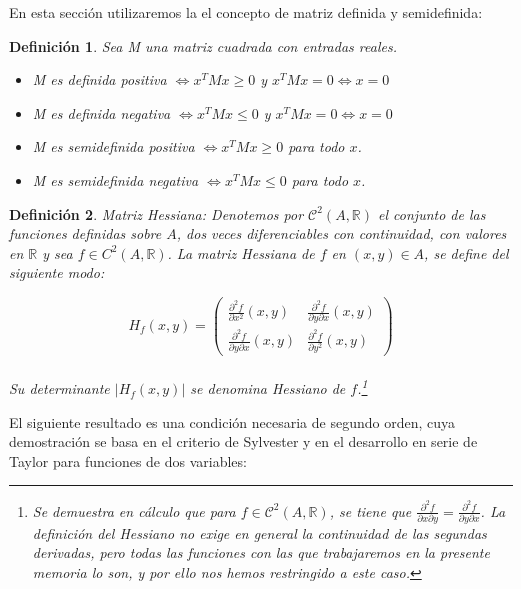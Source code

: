 \documentclass[a4paper,11pt]{article}
\newtheorem{definition}{Definición}
\begin{document}
\noindent
En esta sección utilizaremos la el concepto de matriz definida y semidefinida:
\begin{definition}Sea M una matriz cuadrada con entradas reales.
\begin{itemize}
\item M es definida positiva $\Longleftrightarrow x^TMx \geq 0$ y $x^TMx=0\Leftrightarrow x=0$
\item M es definida negativa  $\Longleftrightarrow x^TMx \leq0$ y $x^TMx=0\Leftrightarrow x=0$
\item M es semidefinida positiva  $\Longleftrightarrow x^TMx \geq0$ para todo $x$.
\item M es semidefinida negativa  $\Longleftrightarrow x^TMx \leq0$  para todo $x$.
\end{itemize}
\end{definition}
\begin{definition}
Matriz Hessiana:  Denotemos por $\mathcal{C}^2(A,\mathbb{R})$  el conjunto de las funciones definidas
sobre $A$, dos veces diferenciables con continuidad, con valores en $\mathbb{R}$ y sea $f \in
C^2(A, \mathbb{R})$. La matriz Hessiana de $f$ en $(x, y) \in A$, se define del siguiente modo:

$$
H_f(x,y)=\left(
\begin{array}{cc}
\frac{\partial^2f}{\partial x^2}(x,y) & \frac{\partial^2f}{\partial y\partial x}(x,y) \\
\frac{\partial^2f}{\partial y\partial x}(x,y) & \frac{\partial^2f}{\partial y^2}(x,y)
\end{array}
\right)
$$
\\
Su determinante $|H_f(x,y)|$ se denomina Hessiano de $f$.\footnote{Se demuestra en cálculo que para $f\in \mathcal{C}^2(A, \mathbb{R})$, se tiene que $\frac{\partial^2f}{\partial x\partial y}=\frac{\partial^2f}{\partial y\partial x}$. La definición del Hessiano no exige en general la continuidad de las segundas derivadas, pero todas las funciones con las que trabajaremos en la presente memoria lo son, y por ello nos hemos restringido a este caso.}


\end{definition}
El siguiente resultado es una condición necesaria de segundo orden, cuya demostración se basa en el criterio de Sylvester y en el desarrollo en serie de Taylor
para funciones de dos variables:
\end{document}
